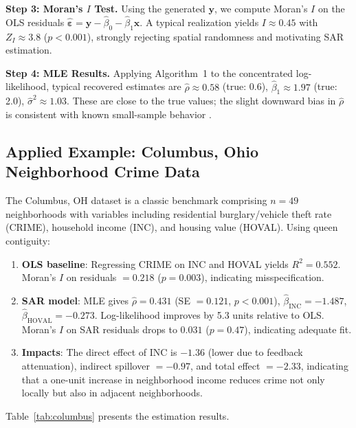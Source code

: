 \documentclass[conference]{IEEEtran}
\theoremstyle{definition}
\begin{document}
\textbf{Step 3: Moran's $I$ Test.} Using the generated $\mathbf{y}$, we compute Moran's $I$ on the OLS residuals $\hat{\bm{\varepsilon}} = \mathbf{y} - \hat{\beta}_0 - \hat{\beta}_1 \mathbf{x}$. A typical realization yields $I \approx 0.45$ with $Z_I \approx 3.8$ ($p < 0.001$), strongly rejecting spatial randomness and motivating SAR estimation.

\textbf{Step 4: MLE Results.} Applying Algorithm~1 to the concentrated log-likelihood, typical recovered estimates are $\hat{\rho} \approx 0.58$ (true: 0.6), $\hat{\beta}_1 \approx 1.97$ (true: 2.0), $\hat{\sigma}^2 \approx 1.03$. These are close to the true values; the slight downward bias in $\hat{\rho}$ is consistent with known small-sample behavior \cite{lee2004asymptotic}.

\subsection{Applied Example: Columbus, Ohio Neighborhood Crime Data}

The Columbus, OH dataset \cite{anselin1988spatial} is a classic benchmark comprising $n = 49$ neighborhoods with variables including residential burglary/vehicle theft rate (CRIME), household income (INC), and housing value (HOVAL). Using queen contiguity:

\begin{enumerate}
\item \textbf{OLS baseline}: Regressing CRIME on INC and HOVAL yields $R^2 = 0.552$. Moran's $I$ on residuals $= 0.218$ ($p = 0.003$), indicating misspecification.

\item \textbf{SAR model}: MLE gives $\hat{\rho} = 0.431$ (SE $= 0.121$, $p < 0.001$), $\hat{\beta}_{\text{INC}} = -1.487$, $\hat{\beta}_{\text{HOVAL}} = -0.273$. Log-likelihood improves by 5.3 units relative to OLS. Moran's $I$ on SAR residuals drops to $0.031$ ($p = 0.47$), indicating adequate fit.

\item \textbf{Impacts}: The direct effect of INC is $-1.36$ (lower due to feedback attenuation), indirect spillover $= -0.97$, and total effect $= -2.33$, indicating that a one-unit increase in neighborhood income reduces crime not only locally but also in adjacent neighborhoods.
\end{enumerate}

Table~\ref{tab:columbus} presents the estimation results.
\end{document}
